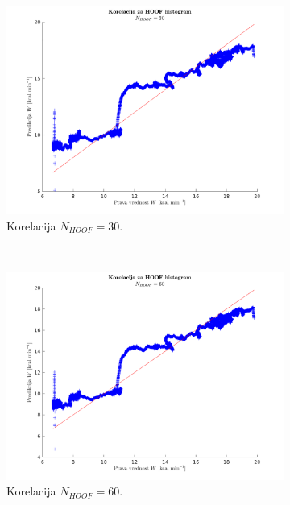 \begin{figure}[htb]
	\centering
    \begin{subfigure}[t]{0.45\columnwidth}
    	\includegraphics[width=\columnwidth]{./Slike/corr-hoof-30.png}
        \caption{Korelacija $N_{HOOF}=30$.}
        \label{fig:corr-hoof-30}
    \end{subfigure}
    ~
    \begin{subfigure}[t]{0.45\columnwidth}
      \includegraphics[width=\columnwidth]{./Slike/corr-hoof-60.png}
      \caption{Korelacija $N_{HOOF}=60$.}
      \label{fig:corr-hoof-60}
    \end{subfigure}
    ~
    \begin{subfigure}[b]{0.45\columnwidth}

\end{subfigure}
\end{figure}
